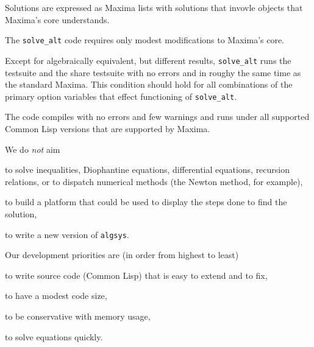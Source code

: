 \documentclass[]{scrartcl}
\newcommand{\altsolve}{\texttt{solve\_alt}}
\newcommand{\algsys}{\texttt{algsys}}
\begin{document}
\begin{alphalist}[]

\item  Solutions are expressed as Maxima lists with solutions that invovle objects that Maxima's core  understands.

 \item The \altsolve\/ code requires only modest modifications to Maxima's core.

\item Except for algebraically equivalent, but different results, \altsolve\/  runs the testsuite and the share testsuite with no errors and in roughy the same time as the standard Maxima. This condition should hold for
all combinations of the primary option variables that effect functioning of \altsolve.

\item The code compiles with no errors and few warnings and runs under all supported Common Lisp versions that are supported by Maxima.
\end{alphalist}
We do \emph{not} aim
\begin{alphalist}[]

\item to solve inequalities, Diophantine equations, differential equations, recursion relations, or to dispatch numerical methods (the Newton method, for example),

\item to build a platform that could be used to display the steps done to find the solution,

\item to write a new version of \algsys.

\end{alphalist}
Our development priorities are (in order from highest to least)

\begin{alphalist}[]

\item to write source code (Common Lisp) that is easy to extend and to fix,

\item to have a modest code size,

\item to be conservative with memory usage,

\item to solve equations quickly.

\end{alphalist}
\end{document}
